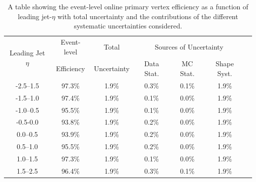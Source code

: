 \begin{table}[!ht]
  \begin{center}
  \begin{tabular}{|c||c|c||c|c|c||c|}
    \hline
\multirow{2}{*}{Leading Jet $\eta$} & Event-level  & Total       & \multicolumn{3}{c|}{Sources of Uncertainty} \\ \cline{4-6} 
                                    & Efficiency   & Uncertainty & Data Stat. & MC Stat. & Shape Syst. \\
\hline
-2.5--1.5 & 97.3\% & 1.9\% & 0.3\% & 0.1\% & 1.9\%  \\
-1.5--1.0 & 97.4\% & 1.9\% & 0.1\% & 0.0\% & 1.9\%  \\
-1.0--0.5 & 95.5\% & 1.9\% & 0.1\% & 0.0\% & 1.9\%  \\
-0.5-0.0  & 93.8\% & 1.9\% & 0.2\% & 0.0\% & 1.9\%  \\
0.0--0.5  & 93.9\% & 1.9\% & 0.2\% & 0.0\% & 1.9\%  \\
0.5--1.0  & 95.5\% & 1.9\% & 0.2\% & 0.0\% & 1.9\%  \\
1.0--1.5  & 97.3\% & 1.9\% & 0.1\% & 0.0\% & 1.9\%  \\
1.5--2.5  & 96.4\% & 1.9\% & 0.3\% & 0.1\% & 1.9\%  \\
\hline
\end{tabular}
  \caption{\label{tab:bTrig_eventEff} A table showing the event-level online primary vertex efficiency as a function of leading jet-$\eta$
    with total uncertainty and the contributions of the different systematic uncertainties considered.}
  \end{center}
\end{table}

\vfill

